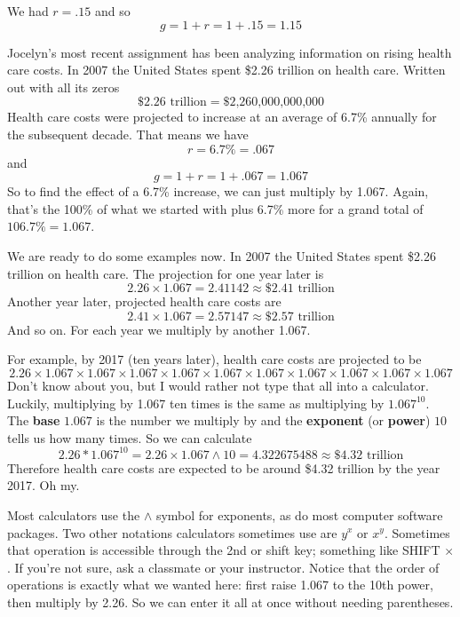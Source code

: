  \noindent We had $r=.15$ and so $$g=1+r=1+.15=1.15$$

Jocelyn's most recent assignment has been analyzing information on rising health care costs.  In 2007 the United States spent \$2.26 trillion on health care. 
Written out with all its zeros $$\$2.26 \text{ trillion} =  \text{\$2,260,000,000,000}$$
Health care costs were projected to increase at an average of 6.7\% annually for the subsequent decade.
That means we have
$$r= 6.7\% = .067$$ and $$g=1+r=1+.067=1.067$$  So to find the effect of a 6.7\% increase, we can just multiply by 1.067.  Again, that's the 100\% of what we started with plus 6.7\% more for a grand total of $106.7\%= 1.067$.
  
We are ready to do some examples now.  In 2007 the United States spent \$2.26 trillion on health care.  The projection for one year later is
$$2.26 \times 1.067 = 2.41142 \approx \$2.41 \text{ trillion}$$  
Another year later, projected health care costs are
$$2.41  \times 1.067 = 2.57147 \approx \$2.57 \text{ trillion}$$  
And so on.  For each year we multiply by another 1.067.  

For example, by 2017 (ten years later), health care costs are projected to be
$$2.26 \times 1.067  \times 1.067  \times 1.067  \times 1.067  \times 1.067  \times 1.067  \times 1.067  \times 1.067  \times 1.067  \times 1.067 $$
Don't know about you, but I would rather not type that all into a calculator.  Luckily, multiplying by 1.067 ten times is the same as multiplying by $1.067^{10}$.  The \textbf{base} $1.067$ is the number we multiply by and the \textbf{exponent} (or \textbf{power}) $10$ tells us how many times.  So we can calculate 
$$2.26  \ast 1.067^{10} = 2.26 \times 1.067 \wedge 10  
= 4.322675488 \approx \$ 4.32 \text{ trillion}$$ 
Therefore health care costs are expected to be around \$4.32 trillion by the year 2017.  Oh my.

Most calculators use the $\wedge$ symbol for exponents, as do most computer software packages. Two other notations calculators sometimes use are $y^x$ or $x^y$.  Sometimes that operation is accessible through the 2nd or shift key; something like SHIFT $\times$.  If you're not sure, ask a classmate or your instructor.  Notice that the order of operations is exactly what we wanted here:  first raise 1.067 to the 10th power, then multiply by 2.26.  So we can enter it all at once without needing parentheses.

